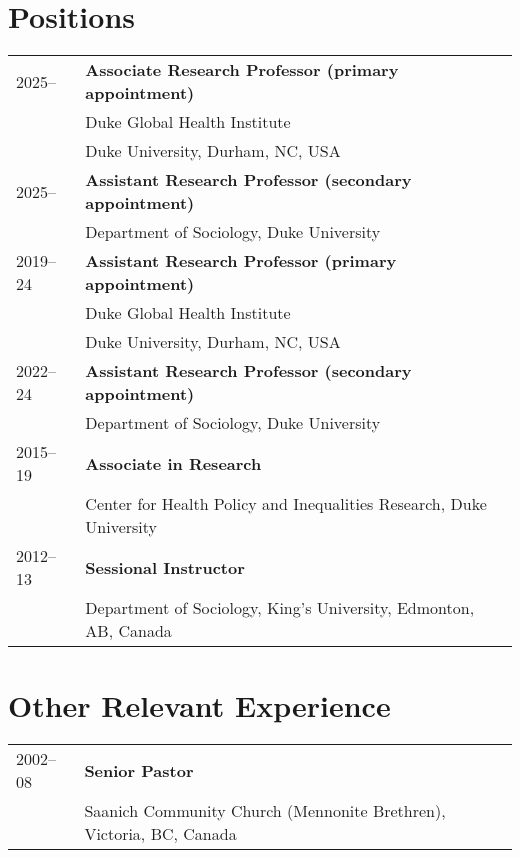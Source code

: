 \vspace{2ex}
\section*{Positions}
\begin{longtable}{p{} p{}}
2025-- & \textbf{Associate Research Professor (primary appointment)}\\
				& Duke Global Health Institute\\
				&Duke University, Durham, NC, USA \\
				
2025-- & \textbf{Assistant Research Professor (secondary appointment)}\\
				& Department of Sociology, Duke University \\

2019--24 & \textbf{Assistant Research Professor (primary appointment)}\\
		             & Duke Global Health Institute\\
		             &Duke University, Durham, NC, USA \\
		             
		             2022--24 & \textbf{Assistant Research Professor (secondary appointment)}\\
		             & Department of Sociology, Duke University \\
		             
2015--19 & \textbf{Associate in Research}\\
& Center for Health Policy and Inequalities Research, Duke University\\

2012--13 & \textbf{Sessional Instructor}\\
	& Department of Sociology, King's University, Edmonton, AB, Canada\\
\end{longtable}
\section*{Other Relevant Experience}
\begin{longtable}{p{} p{}}
	2002--08 & \textbf{Senior Pastor}\\%
	& Saanich Community Church (Mennonite Brethren), Victoria, BC, Canada \\
\end{longtable}